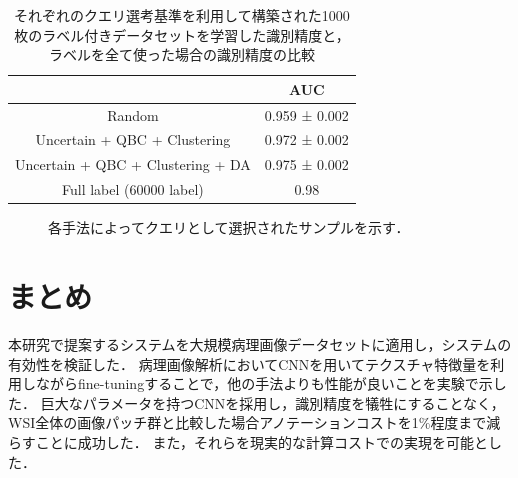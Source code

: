 \begin{table}[h]
  \caption{\label{table:camelyon_last_accuracy}それぞれのクエリ選考基準を利用して構築された1000枚のラベル付きデータセットを学習した識別精度と，ラベルを全て使った場合の識別精度の比較}
  \center
  \begin{tabular}{c|c} 
       &  AUC \\ \hline
      Random & 0.959 ± 0.002  \\
      Uncertain + QBC + Clustering & 0.972 ± 0.002  \\ 
      Uncertain + QBC + Clustering + DA & 0.975 ± 0.002  \\ \hline
      Full label (60000 label) & 0.98
  \end{tabular}
\end{table}

\begin{figure}[hbp]
  \begin{center}

  \caption{\label{figure:camelyon_query_examples}各手法によってクエリとして選択されたサンプルを示す．}
  \end{center}
\end{figure}


\section{まとめ}
本研究で提案するシステムを大規模病理画像データセットに適用し，システムの有効性を検証した．
病理画像解析においてCNNを用いてテクスチャ特徴量を利用しながらfine-tuningすることで，他の手法よりも性能が良いことを実験で示した．
巨大なパラメータを持つCNNを採用し，識別精度を犠牲にすることなく，WSI全体の画像パッチ群と比較した場合アノテーションコストを1$\%$程度まで減らすことに成功した．
また，それらを現実的な計算コストでの実現を可能とした．
